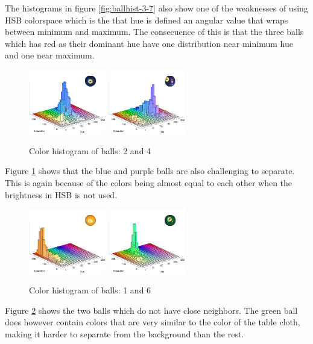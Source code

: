 The histograms in figure \ref{fig:ballhist-3-7} also show one of the weaknesses of using HSB colorspace which is the that hue is defined an angular value that wraps between minimum and maximum. The consecuence of this is that the three  balls which has red as their dominant hue have one distribution near minimum hue and one near maximum.
\begin{figure}[H]
\centering
\subfloat
{
	\includegraphics[width=0.3\textwidth]{images/ballhist/2}
}
\subfloat
{
	\includegraphics[width=0.3\textwidth]{images/ballhist/4}
}
\caption{Color histogram of balls: 2 and 4}
\label{fig:ballhist-2-4}
\end{figure}
Figure \ref{fig:ballhist-2-4} shows that the blue and purple balls are also challenging to separate. This is again because of the colors being almost equal to each other when the brightness in HSB is not used.

\begin{figure}[H]
\centering
\subfloat
{
	\includegraphics[width=0.3\textwidth]{images/ballhist/1}
}
\subfloat
{
	\includegraphics[width=0.3\textwidth]{images/ballhist/6}
}
\caption{Color histogram of balls: 1 and 6}
\label{fig:ballhist-1-6}
\end{figure} 
Figure \ref{fig:ballhist-1-6} shows the two balls which do not have close neighbors. The green ball does however contain colors that are very similar to the color of the table cloth, making it harder to separate from the background than the rest.

